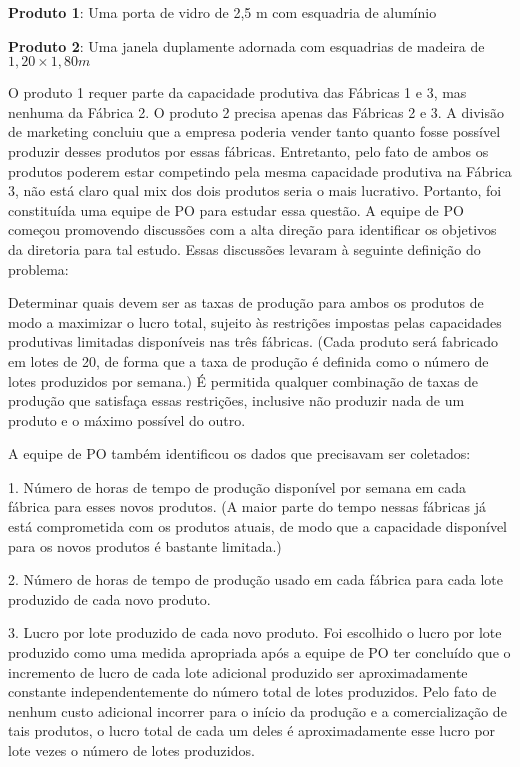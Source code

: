 \begin{alineas} 
\item[] \textbf{Produto 1}: Uma porta de vidro de 2,5 m com esquadria de alumínio
\item[] \textbf{Produto 2}: Uma janela duplamente adornada com esquadrias de madeira de $1,20 \times 1,80 m$ 
\end{alineas} 

O produto 1 requer parte da capacidade produtiva das Fábricas 1 e 3, mas nenhuma da Fábrica 2. O produto 2 precisa apenas das Fábricas 2 e 3. A divisão de marketing concluiu que a empresa poderia vender tanto quanto fosse possível produzir desses produtos por essas fábricas. Entretanto, pelo fato de ambos os produtos poderem estar competindo pela mesma capacidade produtiva na Fábrica 3, não está claro qual mix dos dois produtos seria o mais lucrativo. Portanto, foi constituída uma equipe de PO para estudar essa questão. A equipe de PO começou promovendo discussões com a alta direção para identificar os objetivos da diretoria para tal estudo. Essas discussões levaram à seguinte definição do problema: 

Determinar quais devem ser as taxas de produção para ambos os produtos de modo a maximizar o lucro total, sujeito às restrições impostas pelas capacidades produtivas limitadas disponíveis nas três fábricas. (Cada produto será fabricado em lotes de 20, de forma que a taxa de produção é definida como o número de lotes produzidos por semana.) É permitida qualquer combinação de taxas de produção que satisfaça essas restrições, inclusive não produzir nada de um produto e o máximo possível do outro. 

A equipe de PO também identificou os dados que precisavam ser coletados:

\begin{alineas} 
\item[1.] Número de horas de tempo de produção disponível por semana em cada fábrica para esses novos produtos. (A maior parte do tempo nessas fábricas já está comprometida com os produtos atuais, de modo que a capacidade disponível para os novos produtos é bastante limitada.)
\item[2.] Número de horas de tempo de produção usado em cada fábrica para cada lote produzido de cada novo produto.
\item[3.] Lucro por lote produzido de cada novo produto. Foi escolhido o lucro por lote produzido como uma medida apropriada após a equipe de PO ter concluído que o incremento de lucro de cada lote adicional produzido ser aproximadamente constante independentemente
do número total de lotes produzidos. Pelo fato de nenhum custo adicional incorrer para o início da produção e a comercialização de tais produtos, o lucro total de cada um deles é aproximadamente esse lucro por lote vezes o número de lotes produzidos. 
\end{alineas} 

